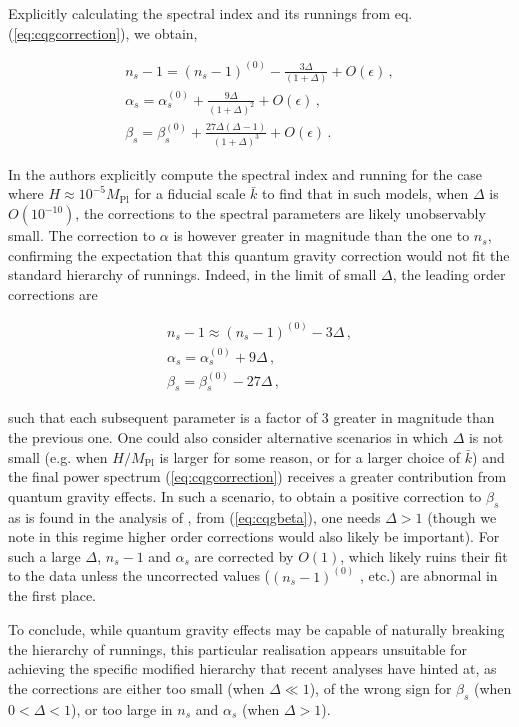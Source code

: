 \documentclass[universe,preprints,oneauthor,pdftex,10pt,a4paper]{mdpi}
\newcommand{\rpar}[1]{\left(#1\right)}
\begin{document}
Explicitly calculating the spectral index and its runnings from eq. (\ref{eq:cqgcorrection}), we obtain,

\begin{align}
n_s - 1 = (n_s - 1)^{(0)} - \frac{3 \Delta}{\rpar{1 + \Delta}} + O(\epsilon) \, , \\
\alpha_s = \alpha_s^{(0)} + \frac{9 \Delta}{\rpar{1 + \Delta}^2} + O(\epsilon) \, ,\\
\beta_s = \beta_s^{(0)} + \frac{27 \Delta \rpar{\Delta - 1}}{\rpar{1 + \Delta}^3} + O(\epsilon)  \, . \label{eq:cqgbeta}
\end{align}

In \cite{Brizuela:2016gnz} the authors explicitly compute the spectral index and running for the case where $H \approx 10^{-5} M_\text{Pl}$ for a fiducial scale $\bar{k}$ to find that in such models, when $\Delta$ is $O(10^{-10})$, the corrections to the spectral parameters are likely unobservably small. The correction to $\alpha$ is however greater in magnitude than the one to $n_s$, confirming the expectation that this quantum gravity correction would not fit the standard hierarchy of runnings. Indeed, in the limit of small $\Delta$, the leading order corrections are

\begin{align}
n_s - 1 \approx (n_s - 1)^{(0)} - 3 \Delta \, , \\
\alpha_s = \alpha_s^{(0)} + 9 \Delta \, ,\\
\beta_s = \beta_s^{(0)} - 27 \Delta  \, ,
\end{align}

such that each subsequent parameter is a factor of 3 greater in magnitude than the previous one. One could also consider alternative scenarios in which $\Delta$ is not small (e.g. when $H/M_\text{Pl}$ is larger for some reason, or for a larger choice of $\bar{k}$) and the final power spectrum (\ref{eq:cqgcorrection}) receives a greater contribution from quantum gravity effects. In such a scenario, to obtain a positive correction to $\beta_s$ as is found in the analysis of \cite{Cabass:2016ldu}, from (\ref{eq:cqgbeta}), one needs $\Delta > 1$ (though we note in this regime higher order corrections would also likely be important). For such a large $\Delta$,  $n_s - 1$ and $\alpha_s$ are corrected by $O(1)$, which likely ruins their fit to the data unless the uncorrected values ($(n_s - 1)^{(0)}$ , etc.) are abnormal in the first place. 

To conclude, while quantum gravity effects may be capable of naturally breaking the hierarchy of runnings, this particular realisation appears unsuitable for achieving the specific modified hierarchy that recent analyses have hinted at, as the corrections are either too small (when $\Delta \ll 1$), of the wrong sign for $\beta_s$ (when $0 < \Delta < 1$), or too large in $n_s$ and $\alpha_s$ (when $\Delta > 1$).
\end{document}
